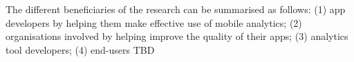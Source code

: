 The different beneficiaries of the research can be summarised as follows: (1) app developers by helping them make effective use of mobile analytics; (2) organisations involved by helping improve the quality of their apps; (3) analytics tool developers; (4) end-users TBD




